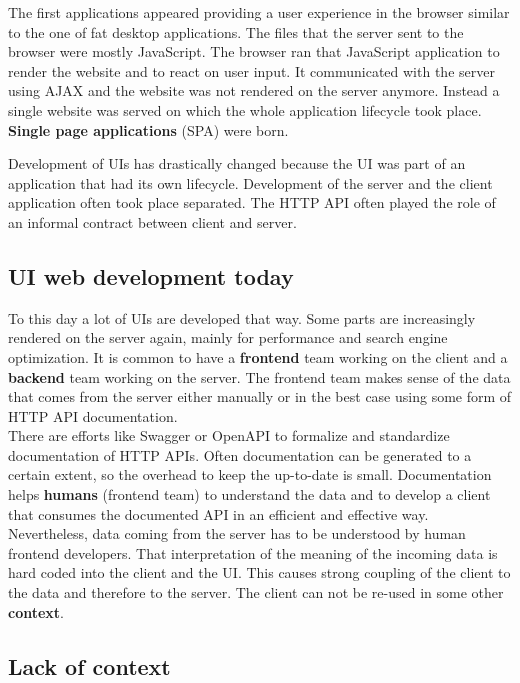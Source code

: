 The first applications appeared providing a user experience in the browser similar to the one of fat desktop applications. The files that the server sent to the browser were mostly JavaScript. The browser ran that JavaScript application to render the website and to react on user input. It communicated with the server using AJAX and the website was not rendered on the server anymore. Instead a single website was served on which the whole application lifecycle took place. \textbf{Single page applications} (SPA) were born.
\par Development of UIs has drastically changed because the UI was part of an application that had its own lifecycle. Development of the server and the client application often took place separated. The HTTP API often played the role of an informal contract between client and server.

\subsection{UI web development today}\label{uidevelopmenttoday}

To this day a lot of UIs are developed that way. Some parts are increasingly rendered on the server again, mainly for performance and search engine optimization. It is common to have a \textbf{frontend} team working on the client and a \textbf{backend} team working on the server. The frontend team makes sense of the data that comes from the server either manually or in the best case using some form of HTTP API documentation.
\\ There are efforts like Swagger or OpenAPI to formalize and standardize documentation of HTTP APIs. Often documentation can be generated to a certain extent, so the overhead to keep the up-to-date is small. Documentation helps \textbf{humans} (frontend team) to understand the data and to develop a client that consumes the documented API in an efficient and effective way.
\\ Nevertheless, data coming from the server has to be understood by human frontend developers. That interpretation of the meaning of the incoming data is hard coded into the client and the UI. This causes strong coupling of the client to the data and therefore to the server. The client can not be re-used in some other \textbf{context}.

\subsection{Lack of context}\label{datahumanmachine}

